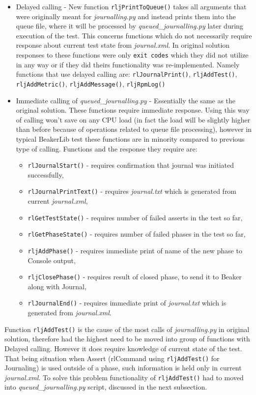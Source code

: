 \begin{itemize}
\item Delayed calling - New function \texttt{rljPrintToQueue()} takes all arguments that were originally meant for \textit{journalling.py} and instead prints them into the queue file, where it will be processed by \textit{queued\_journalling.py} later during execution of the test. This concerns functions which do not necessarily require response about current test state from \textit{journal.xml}.  In original solution responses to these functions were only \texttt{exit codes} which they did not utilize in any way or if they did theirs functionality was re-implemented. Namely functions that use delayed calling are: \texttt{rlJournalPrint()}, \texttt{rljAddTest()}, \texttt{rljAddMetric()}, \texttt{rljAddMessage()}, \texttt{rljRpmLog()}
\item Immediate calling of \textit{queued\_journalling.py} - Essentially the same as the original solution. These functions require immediate response. Using this way of calling won't save on any CPU load (in fact the load will be slightly higher than before because of operations related to queue file processing), however in typical BeakerLib test these functions are in minority compared to previous type of calling.  Functions and the response they require are:  
\begin{itemize}
\item \texttt{rlJournalStart()} - requires confirmation that journal was initiated successfully,
\item \texttt{rlJournalPrintText()} - requires \textit{journal.txt} which is generated from current \mbox{\textit{journal.xml}},
\item \texttt{rlGetTestState()}  - requires number of failed asserts in the test so far,
\item \texttt{rlGetPhaseState()} - requires number of failed phases in the test so far,
\item \texttt{rljAddPhase()} - requires immediate print of name of the new phase to Console output,
\item \texttt{rljClosePhase()} - requires result of closed phase, to send it to Beaker along with Journal,
\item \texttt{rlJournalEnd()} - requires immediate print of \textit{journal.txt} which is generated from \textit{journal.xml}.
\end{itemize}
\end{itemize}

Function \texttt{rljAddTest()} is the cause of the most calls of \textit{journalling.py} in original solution, therefore had the highest need to be moved into group of functions with Delayed calling. However it does require knowledge of current state of the test. That being situation when Assert (rlCommand using \texttt{rljAddTest()} for Journaling) is used outside of a phase, such information is held only in current \textit{journal.xml}. To solve this problem functionality of  \texttt{rljAddTest()} had to moved into \textit{queued\_journalling.py} script, discussed in the next subsection.


